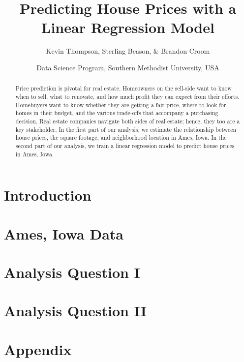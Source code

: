 \documentclass[american,]{article}
\title{Predicting House Prices with a Linear Regression Model}
\author{Kevin Thompson, Sterling Beason, \& Brandon Croom}
\date{Data Science Program, Southern Methodist University, USA \break}
\begin{document}
\maketitle
\begin{abstract}
Price prediction is pivotal for real estate. Homeowners on the sell-side
want to know when to sell, what to renovate, and how much profit they
can expect from their efforts. Homebuyers want to know whether they are
getting a fair price, where to look for homes in their budget, and the
various trade-offs that accompany a purchasing decision. Real estate
companies navigate both sides of real estate; hence, they too are a key
stakeholder. In the first part of our analysis, we estimate the
relationship between house prices, the square footage, and neighborhood
location in Ames, Iowa. In the second part of our analysis, we train a
linear regression model to predict house prices in Ames, Iowa.
\end{abstract}

\section{Introduction}\label{introduction}

\citet{Sleuth}

\section{Ames, Iowa Data}\label{ames-iowa-data}

\citet{Kaggle2016}

\section{Analysis Question I}\label{analysis-question-i}

\citet{Sleuth}

\citet{Pearl2009}

\citet{Ruppert2015}

\section{Analysis Question II}\label{analysis-question-ii}

\citet{Hastie2009}

\section{Appendix}\label{appendix}

\renewcommand\refname{References}

\end{document}
